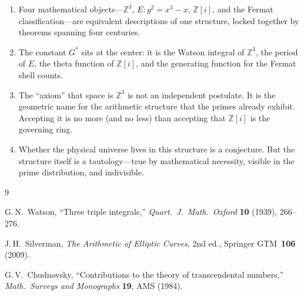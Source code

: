 \documentclass[12pt]{article}
\theoremstyle{definition}
\theoremstyle{remark}
\begin{document}
\begin{enumerate}
    \item Four mathematical objects---$\mathbb{Z}^3$, $E\!: y^2 = x^3 - x$, $\mathbb{Z}[i]$, and the Fermat classification---are equivalent descriptions of one structure, locked together by theorems spanning four centuries.

    \item The constant $G^*$ sits at the center: it is the Watson integral of $\mathbb{Z}^3$, the period of $E$, the theta function of $\mathbb{Z}[i]$, and the generating function for the Fermat shell counts.

    \item The ``axiom'' that space is $\mathbb{Z}^3$ is not an independent postulate. It is the geometric name for the arithmetic structure that the primes already exhibit. Accepting it is no more (and no less) than accepting that $\mathbb{Z}[i]$ is the governing ring.

    \item Whether the physical universe lives in this structure is a conjecture. But the structure itself is a tautology---true by mathematical necessity, visible in the prime distribution, and indivisible.
\end{enumerate}

\begin{thebibliography}{9}

G.\,N.\ Watson, ``Three triple integrals,'' \textit{Quart.\ J.\ Math.\ Oxford} \textbf{10} (1939), 266--276.

J.\,H.\ Silverman, \textit{The Arithmetic of Elliptic Curves}, 2nd ed., Springer GTM~\textbf{106} (2009).

G.\,V.\ Chudnovsky, ``Contributions to the theory of transcendental numbers,'' \textit{Math.\ Surveys and Monographs} \textbf{19}, AMS (1984).

\end{thebibliography}
\end{document}

